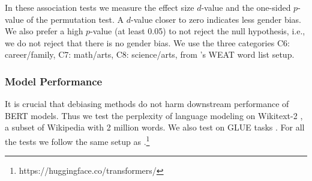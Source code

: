 In these association tests we measure the effect size $d$-value and the
one-sided $p$-value of the permutation test.  A $d$-value
closer to zero indicates less gender bias.  We also prefer a
high $p$-value (at least 0.05) to not reject the null
hypothesis, i.e., we do not reject that there is no gender
bias. We use the three categories C6: career/family, C7: math/arts, C8: science/arts, from \cite{karve2019conceptor}'s WEAT word list
setup.

\subsubsection{Model Performance}
It is crucial that debiasing methods do not harm downstream
performance of BERT models. Thus we test the perplexity of
language modeling on Wikitext-2
\cite{merity2016pointer}, a subset of Wikipedia with 2
million words. We also test on GLUE tasks
\cite{wang2018glue}. For all the tests we follow the same
setup as
\cite{wolf2019huggingfaces}.\footnote{https://huggingface.co/transformers/}